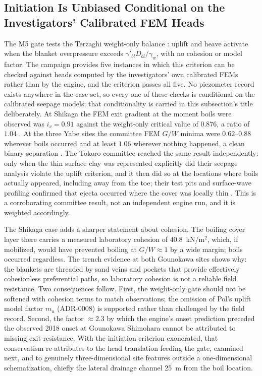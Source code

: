\subsection{Initiation Is Unbiased Conditional on the Investigators'
Calibrated FEM Heads}
\label{subsec: Initiation Unbiased Conditional on FEM Heads}

The M5 gate tests the Terzaghi weight-only balance
\parencite{terzaghi1943, pol_sie_2024}: uplift and heave activate when the
blanket overpressure exceeds $\gamma'_{bl} D_{bl}/\gamma_w$, with no cohesion
or model factor. The campaign provides five instances in which this criterion
can be checked against heads computed by the investigators' own calibrated
FEMs rather than by the engine, and the criterion passes all five. No
piezometer record exists anywhere in the case set, so every one of these
checks is conditional on the calibrated seepage models; that conditionality
is carried in this subsection's title deliberately. At Shikaga
the FEM exit gradient at the moment boils were observed was $i_v = 0.91$
against the weight-only critical value of $0.876$, a ratio of $1.04$
\parencite{sako_gounokawa_2019}. At the three Yabe sites the committee FEM
$G/W$ minima were $0.62$--$0.88$ wherever boils occurred and at least $1.06$
wherever nothing happened, a clean binary separation
\parencite{yabe_levee_committee_2013}. The Tokoro committee reached the same
result independently: only when the thin surface clay was represented
explicitly did their seepage analysis violate the uplift criterion, and it
then did so at the locations where boils actually appeared, including away
from the toe; their test pits and surface-wave profiling confirmed that
ejecta occurred where the cover was locally thin
\parencite{tokoro_levee_committee_2017}. This is a corroborating committee
result, not an independent engine run, and it is weighted accordingly.

The Shikaga case adds a sharper statement about cohesion. The boiling cover
layer there carries a measured laboratory cohesion of $40.8$~kN/m$^2$, which,
if mobilized, would have prevented boiling at $G/W \approx 1$ by a wide
margin; boils occurred regardless. The trench evidence at both Gounokawa
sites shows why: the blankets are threaded by sand veins and pockets that
provide effectively cohesionless preferential paths, so laboratory cohesion
is not a reliable field resistance. Two consequences follow. First, the
weight-only gate should not be softened with cohesion terms to match
observations; the omission of Pol's uplift model factor $m_u$ (ADR-0008) is
supported rather than challenged by the field record. Second, the factor
$\approx 2.3$ by which the engine's onset prediction preceded the observed
2018 onset at Gounokawa Shimohara cannot be attributed to missing exit
resistance. With the initiation criterion exonerated, that conservatism
re-attributes to the head translation feeding the gate, examined next, and
to genuinely three-dimensional site features outside a one-dimensional
schematization, chiefly the lateral drainage channel 25~m from the boil
location.

